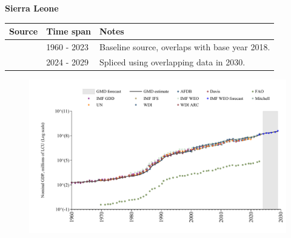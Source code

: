 \documentclass[12pt,a4paper,landscape]{article}
\begin{document}
\begin{adjustbox}{max totalsize={\paperwidth}{\paperheight},center}
\begin{minipage}[t][\textheight][t]{\textwidth}
\vspace*{0.5cm}
{}
\begin{center}
{\Large\bfseries Sierra Leone}
\end{center}
\vspace{0.5cm}
\begin{table}[H]
\centering
\small
\begin{tabular}{|l|l|l|}
\hline
\textbf{Source} & \textbf{Time span} & \textbf{Notes} \\
\hline
\rowcolor{white}\cite{WDI}& 1960 - 2023 &Baseline source, overlaps with base year 2018.\\
\rowcolor{lightgray}\cite{IMF_WEO_forecast}& 2024 - 2029 &Spliced using overlapping data in 2030.\\
\hline
\end{tabular}
\end{table}
\begin{figure}[H]
\centering
\includegraphics[width=\textwidth,height=0.6\textheight,keepaspectratio]{graphs/SLE_nGDP.pdf}
\end{figure}
\end{minipage}
\end{adjustbox}
\end{document}
